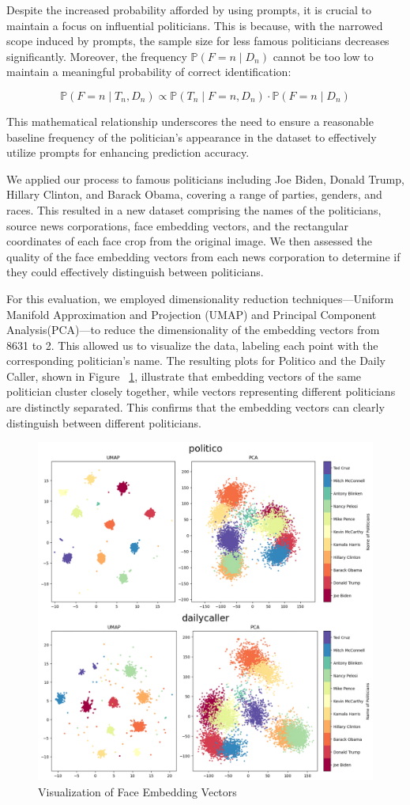 \documentclass[sigconf]{acmart}
\newcommand{\Prob}[1]{\mathbb{P}\left(#1\right)}
\begin{document}
Despite the increased probability afforded by using prompts, it is crucial to maintain a focus on influential politicians. This is because, with the narrowed scope induced by prompts, the sample size for less famous politicians decreases significantly. Moreover, the frequency \( \Prob{F = n \mid D_n} \) cannot be too low to maintain a meaningful probability of correct identification:

\[
\Prob{F = n \mid T_n, D_n} \propto \Prob{T_n \mid F = n, D_n} \cdot \Prob{F = n \mid D_n}
\]

This mathematical relationship underscores the need to ensure a reasonable baseline frequency of the politician's appearance in the dataset to effectively utilize prompts for enhancing prediction accuracy.

We applied our process to famous politicians including Joe Biden, Donald Trump, Hillary Clinton, and Barack Obama, covering a range of parties, genders, and races. This resulted in a new dataset comprising the names of the politicians, source news corporations, face embedding vectors, and the rectangular coordinates of each face crop from the original image. We then assessed the quality of the face embedding vectors from each news corporation to determine if they could effectively distinguish between politicians.

For this evaluation, we employed dimensionality reduction techniques—Uniform Manifold Approximation and Projection (UMAP) and Principal Component Analysis(PCA)—to reduce the dimensionality of the embedding vectors from 8631 to 2. This allowed us to visualize the data, labeling each point with the corresponding politician's name. The resulting plots for Politico and the Daily Caller, shown in Figure ~\ref{fig:embd}, illustrate that embedding vectors of the same politician cluster closely together, while vectors representing different politicians are distinctly separated. This confirms that the embedding vectors can clearly distinguish between different politicians.

\begin{figure}
    \centering
    \includegraphics[width=.5\textwidth]{assets/embd.png}
    \caption{Visualization of Face Embedding Vectors}
    \label{fig:embd}
    \vspace{10pt}
\end{figure}
\end{document}
